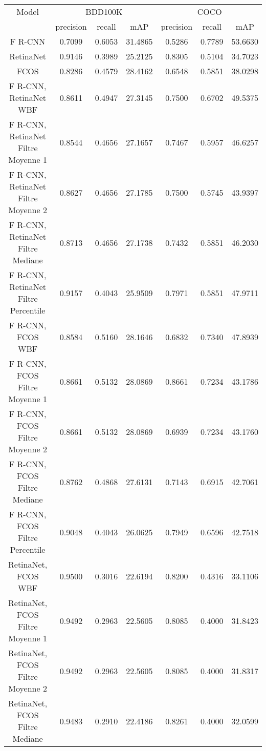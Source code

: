 \documentclass{article}
\begin{document}
\begin{table}[h!]
\centering
\begin{tabular}{|c||c|c|c||c|c|c|} 
\hline
Model & \multicolumn{3}{|c||}{BDD100K} & \multicolumn{3}{|c|}{COCO} \\ 
 & precision & recall & mAP  & precision & recall & mAP  \\ [0.5ex] 
\hline
F R-CNN & 0.7099 & 0.6053 & 31.4865 & 0.5286 & 0.7789 & 53.6630 \\ 
\hline
RetinaNet & 0.9146 & 0.3989 & 25.2125 & 0.8305 & 0.5104 & 34.7023 \\ 
\hline
FCOS & 0.8286 & 0.4579 & 28.4162 & 0.6548 & 0.5851 & 38.0298 \\ 
\hline
F R-CNN, RetinaNet WBF & 0.8611 & 0.4947 & 27.3145 & 0.7500 & 0.6702 & 49.5375 \\ 
\hline
F R-CNN, RetinaNet Filtre Moyenne 1 & 0.8544 & 0.4656 & 27.1657 & 0.7467 & 0.5957 & 46.6257 \\ 
\hline
F R-CNN, RetinaNet Filtre Moyenne 2 & 0.8627 & 0.4656 & 27.1785 & 0.7500 & 0.5745 & 43.9397 \\ 
\hline
F R-CNN, RetinaNet Filtre Mediane & 0.8713 & 0.4656 & 27.1738 & 0.7432 & 0.5851 & 46.2030 \\ 
\hline
F R-CNN, RetinaNet Filtre Percentile & 0.9157 & 0.4043 & 25.9509 & 0.7971 & 0.5851 & 47.9711 \\ 
\hline
F R-CNN, FCOS WBF & 0.8584 & 0.5160 & 28.1646 & 0.6832 & 0.7340 & 47.8939 \\ 
\hline
F R-CNN, FCOS Filtre Moyenne 1 & 0.8661 & 0.5132 & 28.0869 & 0.8661 & 0.7234 & 43.1786 \\ 
\hline
F R-CNN, FCOS Filtre Moyenne 2 & 0.8661 & 0.5132 & 28.0869 & 0.6939 & 0.7234 & 43.1760 \\ 
\hline
F R-CNN, FCOS Filtre Mediane & 0.8762 & 0.4868 & 27.6131 & 0.7143 & 0.6915 & 42.7061 \\ 
\hline
F R-CNN, FCOS Filtre Percentile & 0.9048 & 0.4043 & 26.0625 & 0.7949 & 0.6596 & 42.7518 \\ 
\hline
RetinaNet, FCOS WBF & 0.9500 & 0.3016 & 22.6194 & 0.8200 & 0.4316 & 33.1106 \\ 
\hline
RetinaNet, FCOS Filtre Moyenne 1 & 0.9492 & 0.2963 & 22.5605 & 0.8085 & 0.4000 & 31.8423 \\ 
\hline
RetinaNet, FCOS Filtre Moyenne 2 & 0.9492 & 0.2963 & 22.5605 & 0.8085 & 0.4000 & 31.8317 \\ 
\hline
RetinaNet, FCOS Filtre Mediane & 0.9483 & 0.2910 & 22.4186 & 0.8261 & 0.4000 & 32.0599 \\ 

\end{tabular}
\end{table}
\end{document}
